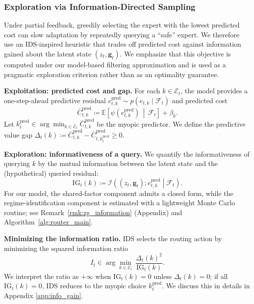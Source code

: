\subsubsection{Exploration via Information-Directed Sampling}
\label{sec:exploration}

Under partial feedback, greedily selecting the expert with the lowest predicted cost can slow
adaptation by repeatedly querying a ``safe'' expert. We therefore use an IDS-inspired heuristic
\citep{russo2014learning} that trades off predicted cost against information gained about the latent
state \((z_t,\mathbf{g}_t)\). We emphasize that this objective is computed under our model-based
filtering approximation and is used as a pragmatic exploration criterion rather than as an
optimality guarantee.

\textbf{Exploitation: predicted cost and gap.}
For each \(k\in\mathcal{E}_t\), the model provides a one-step-ahead predictive residual
\(e_{t,k}^{\mathrm{pred}}\sim p(e_{t,k}\mid\mathcal{F}_t)\) and predicted cost
\[
\bar C_{t,k}^{\mathrm{pred}}
\coloneqq
\mathbb{E}\!\left[\psi(e_{t,k}^{\mathrm{pred}})\,\middle|\,\mathcal{F}_t\right]+\beta_k.
\]
Let \(k_t^{\mathrm{pred}} \in \arg\min_{k\in\mathcal{E}_t} \bar C_{t,k}^{\mathrm{pred}}\) be the myopic
predictor. We define the predictive value gap $\Delta_t(k)
\coloneqq
\bar C_{t,k}^{\mathrm{pred}}-\bar C_{t,k_t^{\mathrm{pred}}}^{\mathrm{pred}}
\ge 0.$

\textbf{Exploration: informativeness of a query.}
We quantify the informativeness of querying \(k\) by the mutual information between the latent state
and the (hypothetical) queried residual:
\begin{equation}
\label{eq:ig_operational}
\mathrm{IG}_t(k)
\coloneqq
\mathcal{I}\left((z_t,\mathbf{g}_t); e_{t,k}^{\mathrm{pred}} \middle| \mathcal{F}_t\right).
\end{equation}
For our model, the shared-factor component admits a closed form, while the regime-identification
component is estimated with a lightweight Monte Carlo routine; see Remark~\ref{rmk:zg_information}
(Appendix) and Algorithm~\ref{alg:router_main}.

\textbf{Minimizing the information ratio.}
IDS selects the routing action by minimizing the squared information ratio
\begin{equation}
\label{eq:ids_deterministic}
I_t \in \arg\min_{k\in\mathcal{E}_t}\ \frac{\Delta_t(k)^2}{\mathrm{IG}_t(k)}.
\end{equation}
We interpret the ratio as \(+\infty\) when \(\mathrm{IG}_t(k)=0\) unless \(\Delta_t(k)=0\); if all
\(\mathrm{IG}_t(k)=0\), IDS reduces to the myopic choice \(k_t^{\mathrm{pred}}\). We discuss this in details in Appendix \ref{app:info_gain}. 


